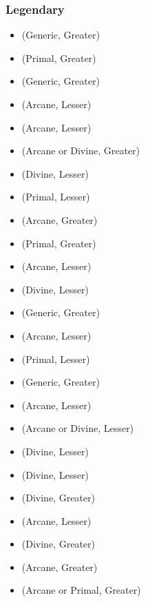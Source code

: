 \subsubsection{Legendary}
\begin{itemize}
	\item {} (Generic, Greater)
	\item {} (Primal, Greater)
	\item {} (Generic, Greater)
	\item {} (Arcane, Lesser)
	\item {} (Arcane, Lesser)
	\item {} (Arcane or Divine, Greater)
	\item {} (Divine, Lesser)
	\item {} (Primal, Lesser)
	\item {} (Arcane, Greater)
	\item {} (Primal, Greater)
	\item {} (Arcane, Lesser)
	\item {} (Divine, Lesser)
	\item {} (Generic, Greater)
	\item {} (Arcane, Lesser)
	\item {} (Primal, Lesser)
	\item {} (Generic, Greater)
	\item {} (Arcane, Lesser)
	\item {} (Arcane or Divine, Lesser)
	\item {} (Divine, Lesser)
	\item {} (Divine, Lesser)
	\item {} (Divine, Greater)
	\item {} (Arcane, Lesser)
	\item {} (Divine, Greater)
	\item {} (Arcane, Greater)
	\item {} (Arcane or Primal, Greater)

\end{itemize}
